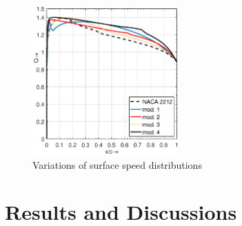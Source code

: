 \documentclass[main.tex]{subfiles}
\begin{document}
\pagebreak
\begin{figure}[t]
\centering
\includegraphics[width=0.5\textwidth]{./Images/Ass3/QvsX_mod}
\caption{Variations of surface speed distributions}
\label{fig3}
\end{figure}

\section{Results and Discussions}
\end{document}
